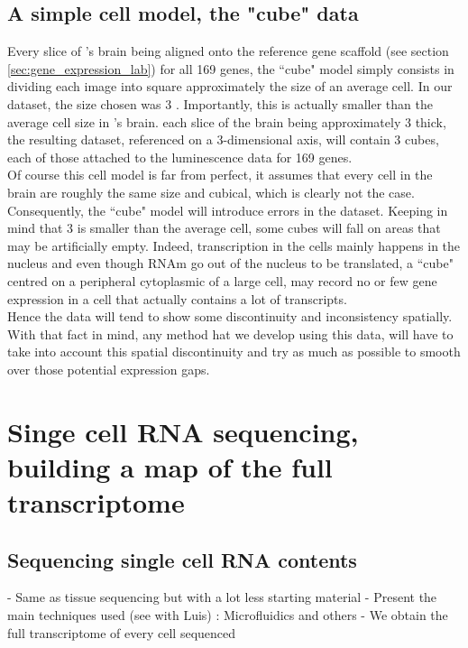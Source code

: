   \subsection*{A simple cell model, the "cube" data}
  
  Every slice of \platy{}'s brain being aligned onto the reference gene scaffold (see section \ref{sec:gene_expression_lab}) for all 169 genes, the ``cube" model simply consists in dividing each image into square approximately the size of an average cell. In our dataset, the size chosen was 3 . Importantly, this is actually smaller than the average cell size in \platy{}'s brain. each slice of the brain being approximately 3 \microm{} thick, the resulting dataset, referenced on a 3-dimensional axis, will contain 3  cubes, each of those attached to the luminescence data for 169 genes.\\
  
  Of course this cell model is far from perfect, it assumes that every cell in the brain are roughly the same size and cubical, which is clearly not the case. Consequently, the ``cube" model will introduce errors in the dataset. Keeping in mind that 3  is smaller than the average cell, some cubes will fall on areas that may be artificially empty. Indeed, transcription in the cells mainly happens in the nucleus and even though RNAm go out of the nucleus to be translated, a ``cube" centred on a peripheral cytoplasmic of a large cell, may record no or few gene expression in a cell that actually contains a lot of transcripts.\\
  
  Hence the data will tend to show some discontinuity and inconsistency spatially. With that fact in mind, any method hat we develop using this data, will have to take into account this spatial discontinuity and try as much as possible to smooth over those potential expression gaps.\\
  

\section{Singe cell RNA sequencing, building a map of the full transcriptome}
  \subsection*{Sequencing single cell RNA contents}
    - Same as tissue sequencing but with a lot less starting material
    - Present the main techniques used (see with Luis) : Microfluidics and others
    - We obtain the full transcriptome of every cell sequenced

